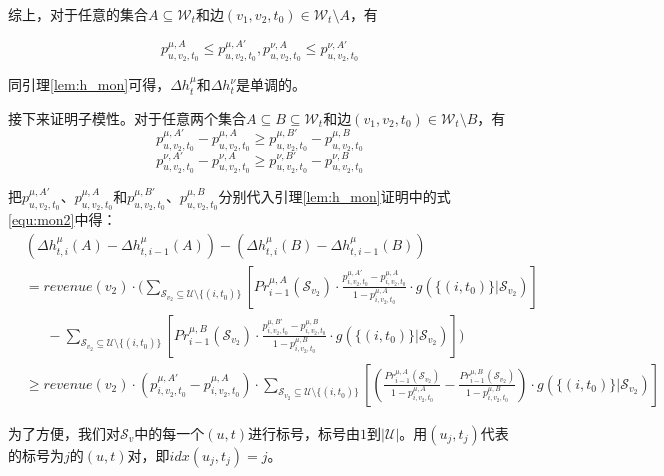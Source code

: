 综上，对于任意的集合$A \subseteq \mathcal{W}_t$和边$(v_1,v_2,t_0) \in \mathcal{W}_t\setminus A$，有

\begin{equation}
    p_{u,v_2,t_0}^{\mu,A} \le p_{u,v_2,t_0}^{\mu,A'},p_{u,v_2,t_0}^{\nu,A} \le p_{u,v_2,t_0}^{\nu,A'}
\end{equation}

同引理\ref{lem:h_mon}可得，$\Delta h_t^\mu$和$\Delta h_t^\nu$是单调的。

接下来证明子模性。对于任意两个集合$A\subseteq B \subseteq \mathcal{W}_t$和边$(v_1,v_2,t_0) \in \mathcal{W}_t \setminus B$，有
\begin{equation}
    p_{u,v_2,t_0}^{\mu,A'}-p_{u,v_2,t_0}^{\mu,A}\ge  p_{u,v_2,t_0}^{\mu,B'}-p_{u,v_2,t_0}^{\mu,B}
\end{equation}
\begin{equation}
    p_{u,v_2,t_0}^{\nu,A'}-p_{u,v_2,t_0}^{\nu,A}\ge  p_{u,v_2,t_0}^{\nu,B'}-p_{u,v_2,t_0}^{\nu,B}
\end{equation}

把$p_{u,v_2,t_0}^{\mu,A'}$、$p_{u,v_2,t_0}^{\mu,A}$和$p_{u,v_2,t_0}^{\mu,B'}$、$p_{u,v_2,t_0}^{\mu,B}$分别代入引理\ref{lem:h_mon}证明中的式\ref{equ:mon2}中得：
\begin{align}
    &(\Delta h_{t,i}^{\mu}(A)-\Delta h_{t,i-1}^{\mu}(A)) - (\Delta h_{t,i}^{\mu}(B)-\Delta h_{t,i-1}^{\mu}(B)) \\ 
    &=revenue(v_2)\cdot (\sum_{\mathcal{S}_{v_2}\subseteq \mathcal{U}\setminus \{(i,t_0)\}}\left[Pr_{i-1}^{\mu,A}(\mathcal{S}_{v_2})\cdot\frac{p_{i,v_2,t_0}^{\mu,A'}-p_{i,v_2,t_0}^{\mu,A}}{1-p_{i,v_2,t_0}^{\mu,A}} \cdot g(\{(i,t_0)\} |\mathcal{S}_{v_2})\right] \\
    & \  \ \ \ \ \ \ - \sum_{\mathcal{S}_{v_2}\subseteq \mathcal{U}\setminus \{(i,t_0)\}}\left[Pr_{i-1}^{\mu,B}(\mathcal{S}_{v_2})\cdot\frac{p_{i,v_2,t_0}^{\mu,B'}-p_{i,v_2,t_0}^{\mu,B}}{1-p_{i,v_2,t_0}^{\mu,B}} \cdot g(\{(i,t_0)\} |\mathcal{S}_{v_2})\right] )\\ 
    &\ge revenue(v_2)\cdot (p_{i,v_2,t_0}^{\mu,A'}-p_{i,v_2,t_0}^{\mu,A})  
    \cdot \sum_{\mathcal{S}_{v_2}\subseteq \mathcal{U}\setminus \{(i,t_0)\}}\left[\left(\frac{Pr_{i-1}^{\mu,A}(\mathcal{S}_{v_2})}{1-p_{i,v_2,t_0}^{\mu,A}}-\frac{Pr_{i-1}^{\mu,B}(\mathcal{S}_{v_2})}{1-p_{i,v_2,t_0}^{\mu,B}}\right) \cdot g(\{(i,t_0)\} |\mathcal{S}_{v_2})\right] \label{equ:prof_sub1}
\end{align}

为了方便，我们对$\mathcal{S}_v$中的每一个$(u,t)$进行标号，标号由$1$到$|\mathcal{U}|。$用$(u_j,t_j)$代表的标号为$j$的$(u,t)$对，即$idx(u_j,t_j)=j$。


